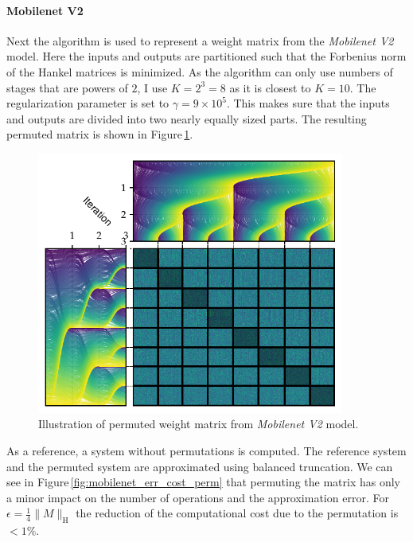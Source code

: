 \documentclass[doctype=mastersthesis,BCOR=15mm,biblatex]{ldvbook}%
\begin{document}
\paragraph{Mobilenet V2}
Next the algorithm is used to represent a weight matrix from the \emph{Mobilenet V2} model.
Here the inputs and outputs are partitioned such that the Forbenius norm of the Hankel matrices is minimized.
As the algorithm can only use numbers of stages that are powers of $2$, I use $K=2^3=8$ as it is closest to $K=10$.
The regularization parameter is set to $\gamma=9\times10^5$.
This makes sure that the inputs and outputs are divided into two nearly equally sized parts.
The resulting permuted matrix is shown in Figure\,\ref{fig:mobilenet_permutation}.
\begin{figure}[!htb]
	\centering
	\includegraphics[width=0.9\textwidth]{Plots/Mobilenet_permute.pdf}
	\caption{Illustration of permuted weight matrix from \emph{Mobilenet V2} model.
	}
	\label{fig:mobilenet_permutation}
\end{figure}
As a reference, a system without permutations is computed.
The reference system and the permuted system are approximated using balanced truncation.
We can see in Figure\,\ref{fig:mobilenet_err_cost_perm} that permuting the matrix has only a minor impact on the number of operations and the approximation error.
For $\epsilon = \frac{1}{4}\|M\|_\text{H}$ the reduction of the computational cost due to the permutation is $<1\%$.
\end{document}
